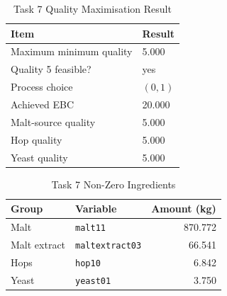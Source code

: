 \begin{table}[!t]
\renewcommand{\arraystretch}{1.15}
\caption{Task 7 Quality Maximisation Result}
\label{tab:task37-quality}
\centering
\small
\begin{tabular}{@{}ll@{}}
\toprule
Item & Result \\
\midrule
Maximum minimum quality & 5.000 \\
Quality 5 feasible? & yes \\
Process choice & $(0,1)$ \\
Achieved EBC & 20.000 \\
Malt-source quality & 5.000 \\
Hop quality & 5.000 \\
Yeast quality & 5.000 \\
\bottomrule
\end{tabular}
\end{table}

\begin{table}[!t]
\renewcommand{\arraystretch}{1.15}
\caption{Task 7 Non-Zero Ingredients}
\label{tab:task37-ingredients}
\centering
\small
\begin{tabular}{@{}llr@{}}
\toprule
Group & Variable & Amount (kg) \\
\midrule
Malt & \texttt{malt11} & 870.772 \\
Malt extract & \texttt{maltextract03} & 66.541 \\
Hops & \texttt{hop10} & 6.842 \\
Yeast & \texttt{yeast01} & 3.750 \\
\bottomrule
\end{tabular}
\end{table}


